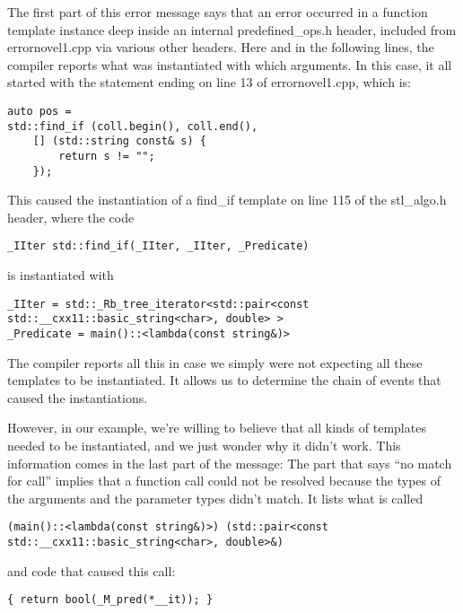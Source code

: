 The first part of this error message says that an error occurred in a function template instance deep inside an internal predefined\_ops.h header, included from errornovel1.cpp via various other headers. Here and in the following lines, the compiler reports what was instantiated with which arguments. In this case, it all started with the statement ending on line 13 of errornovel1.cpp, which is:

\begin{lstlisting}[style=styleCXX]
auto pos = 
std::find_if (coll.begin(), coll.end(),
	[] (std::string const& s) {
		return s != "";
	});
\end{lstlisting}

This caused the instantiation of a find\_if template on line 115 of the stl\_algo.h header, where the code

\begin{lstlisting}[style=styleCXX]
_IIter std::find_if(_IIter, _IIter, _Predicate)
\end{lstlisting}

is instantiated with

\begin{lstlisting}[style=styleCXX]
_IIter = std::_Rb_tree_iterator<std::pair<const std::__cxx11::basic_string<char>, double> >
_Predicate = main()::<lambda(const string&)>
\end{lstlisting}

The compiler reports all this in case we simply were not expecting all these templates to be instantiated. It allows us to determine the chain of events that caused the instantiations.

However, in our example, we’re willing to believe that all kinds of templates needed to be instantiated, and we just wonder why it didn’t work. This information comes in the last part of the message: The part that says “no match for call” implies that a function call could not be resolved because the types of the arguments and the parameter types didn’t match. It lists what is called

\begin{lstlisting}[style=styleCXX]
(main()::<lambda(const string&)>) (std::pair<const std::__cxx11::basic_string<char>, double>&)
\end{lstlisting}

and code that caused this call:

\begin{lstlisting}[style=styleCXX]
{ return bool(_M_pred(*__it)); }
\end{lstlisting}

